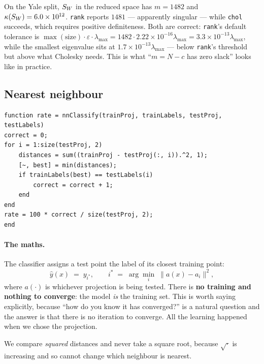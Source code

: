 \begin{gotcha}
On the Yale split, $S_W$ in the reduced space has $m = 1482$ and
$\kappa(S_W) = 6.0\times10^{12}$. \texttt{rank} reports $1481$ --- apparently
singular --- while \texttt{chol} succeeds, which requires positive
definiteness. Both are correct: \texttt{rank}'s default tolerance is
$\max(\text{size})\cdot\varepsilon\cdot\lambda_{\max}
= 1482 \cdot 2.22\times10^{-16}\lambda_{\max} = 3.3\times10^{-13}\lambda_{\max}$,
while the smallest eigenvalue sits at $1.7\times10^{-13}\lambda_{\max}$ --- below
\texttt{rank}'s threshold but above what Cholesky needs. This is what
``$m = N-c$ has zero slack'' looks like in practice.
\end{gotcha}

\subsection{Nearest neighbour}

\begin{lstlisting}
function rate = nnClassify(trainProj, trainLabels, testProj, testLabels)
correct = 0;
for i = 1:size(testProj, 2)
    distances = sum((trainProj - testProj(:, i)).^2, 1);
    [~, best] = min(distances);
    if trainLabels(best) == testLabels(i)
        correct = correct + 1;
    end
end
rate = 100 * correct / size(testProj, 2);
end
\end{lstlisting}

\paragraph{The maths.} The classifier assigns a test point the label of its
closest training point:
\[
  \hat{y}(x) \;=\; y_{i^*}, \qquad
  i^* \;=\; \arg\min_{i} \;\|a(x) - a_i\|^2 ,
\]
where $a(\cdot)$ is whichever projection is being tested. There is
\textbf{no training and nothing to converge}: the model \emph{is} the training
set. This is worth saying explicitly, because ``how do you know it has
converged?'' is a natural question and the answer is that there is no iteration
to converge. All the learning happened when we chose the projection.

We compare \emph{squared} distances and never take a square root, because
$\sqrt{\cdot}$ is increasing and so cannot change which neighbour is nearest.

